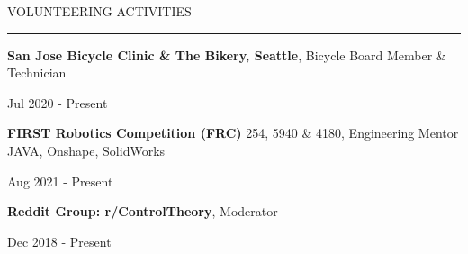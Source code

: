 
{
\hspace{-1.72in}\noindent\color{cblue}
{VOLUNTEERING ACTIVITIES} %
}

\vspace{-2.0ex}
{\hspace{-1.73in}\noindent\color{dblue}\rule{6.935in}{0.4pt}} %
\vspace{-2ex}

{\hspace{-1.73in}\small
\textbf{San Jose Bicycle Clinic \& The Bikery, Seattle}, Bicycle Board Member \& Technician }

\vspace{-4.5ex}
\begin{subtitle}
    Jul 2020 - Present
\end{subtitle}

\vspace{-2ex}
{\hspace{-1.73in}\small
\textbf{FIRST Robotics Competition (FRC)} 254, 5940 \& 4180, Engineering Mentor } {\color{cyan}\small JAVA, Onshape, SolidWorks}

\vspace{-4.5ex}
\begin{subtitle}
    Aug 2021 - Present
\end{subtitle}

\vspace{-2ex}
{\hspace{-1.73in}\small
\textbf{Reddit Group: r/ControlTheory}, Moderator}

\vspace{-4.5ex}
\begin{subtitle}
    Dec 2018 - Present
\end{subtitle}



